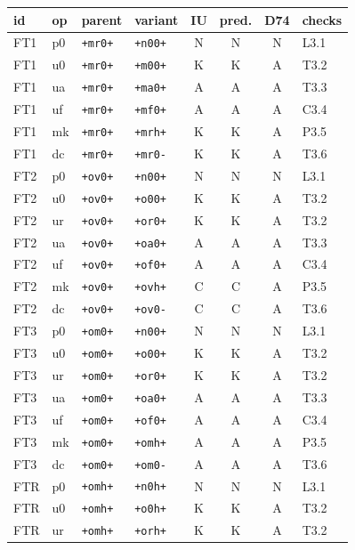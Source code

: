 {\scriptsize
\begin{longtable}{@{}llllcccl@{}}
id & op & parent & variant & IU & pred. & D74 & checks \\ \midrule\endhead
FT1 & p0 & \texttt{+mr0+} & \texttt{+n00+} & N & N & N & L3.1 \\
FT1 & u0 & \texttt{+mr0+} & \texttt{+m00+} & K & K & A & T3.2 \\
FT1 & ua & \texttt{+mr0+} & \texttt{+ma0+} & A & A & A & T3.3 \\
FT1 & uf & \texttt{+mr0+} & \texttt{+mf0+} & A & A & A & C3.4 \\
FT1 & mk & \texttt{+mr0+} & \texttt{+mrh+} & K & K & A & P3.5 \\
FT1 & dc & \texttt{+mr0+} & \texttt{+mr0-} & K & K & A & T3.6 \\
FT2 & p0 & \texttt{+ov0+} & \texttt{+n00+} & N & N & N & L3.1 \\
FT2 & u0 & \texttt{+ov0+} & \texttt{+o00+} & K & K & A & T3.2 \\
FT2 & ur & \texttt{+ov0+} & \texttt{+or0+} & K & K & A & T3.2 \\
FT2 & ua & \texttt{+ov0+} & \texttt{+oa0+} & A & A & A & T3.3 \\
FT2 & uf & \texttt{+ov0+} & \texttt{+of0+} & A & A & A & C3.4 \\
FT2 & mk & \texttt{+ov0+} & \texttt{+ovh+} & C & C & A & P3.5 \\
FT2 & dc & \texttt{+ov0+} & \texttt{+ov0-} & C & C & A & T3.6 \\
FT3 & p0 & \texttt{+om0+} & \texttt{+n00+} & N & N & N & L3.1 \\
FT3 & u0 & \texttt{+om0+} & \texttt{+o00+} & K & K & A & T3.2 \\
FT3 & ur & \texttt{+om0+} & \texttt{+or0+} & K & K & A & T3.2 \\
FT3 & ua & \texttt{+om0+} & \texttt{+oa0+} & A & A & A & T3.3 \\
FT3 & uf & \texttt{+om0+} & \texttt{+of0+} & A & A & A & C3.4 \\
FT3 & mk & \texttt{+om0+} & \texttt{+omh+} & A & A & A & P3.5 \\
FT3 & dc & \texttt{+om0+} & \texttt{+om0-} & A & A & A & T3.6 \\
FTR & p0 & \texttt{+omh+} & \texttt{+n0h+} & N & N & N & L3.1 \\
FTR & u0 & \texttt{+omh+} & \texttt{+o0h+} & K & K & A & T3.2 \\
FTR & ur & \texttt{+omh+} & \texttt{+orh+} & K & K & A & T3.2 \\

\end{longtable}}

